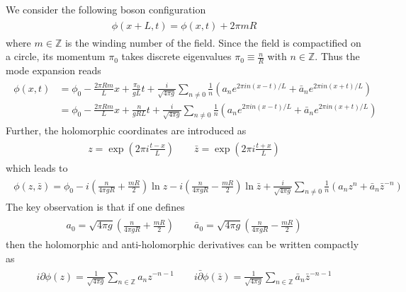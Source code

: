 We consider the following boson configuration
\begin{eqnarray}\begin{aligned}
\phi(x+L,t)=\phi(x,t)+2\pi mR
\end{aligned}\end{eqnarray}
where $m\in\mathbb{Z}$ is the winding number of the field. Since the field is compactified on a circle, its momentum $\pi_0$ takes discrete eigenvalues $\pi_0\equiv\frac{n}{R}$ with $n\in\mathbb{Z}$. Thus the mode expansion reads
\begin{eqnarray}\begin{aligned}
\label{eq:mode_expand_compact}
\phi(x,t)&=\phi_0-\frac{2\pi Rm}{L}x+\frac{\pi_0}{gL}t+\frac{i}{\sqrt{4\pi g}}\sum_{n\neq0}\frac{1}{n}(a_ne^{2\pi i n(x-t)/L}+\bar{a}_{n}e^{2\pi i n(x+t)/L})\\ 
&={\phi}_0-\frac{2\pi Rm}{L}x+\frac{n}{gRL}t+\frac{i}{\sqrt{4\pi g}}\sum_{n\neq0}\frac{1}{n}(a_ne^{2\pi i n(x-t)/L}+\bar{a}_{n}e^{2\pi i n(x+t)/L})
\end{aligned}\end{eqnarray}
Further, the holomorphic coordinates are introduced as
\begin{eqnarray}\begin{aligned}
z=\exp\left(2\pi i\frac{t-x}{L}\right)\qquad\bar{z}=\exp\left(2\pi i\frac{t+x}{L}\right)
\end{aligned}\end{eqnarray}
which leads to 
\begin{eqnarray}\begin{aligned}
\label{eq:phi_in_z}
\phi(z,\bar{z})=\phi_0-i\left(\frac{n}{4\pi gR}+\frac{mR}{2}\right)\ln z-i\left(\frac{n}{4\pi gR}-\frac{mR}{2}\right)\ln \bar{z}+\frac{i}{\sqrt{4\pi g}}\sum_{n\neq0}\frac{1}{n}(a_nz^{n}+\bar{a}_{n}\bar{z}^{-n})
\end{aligned}\end{eqnarray}
The key observation is that if one defines
\begin{eqnarray}\begin{aligned}
a_0=\sqrt{4\pi g}\left(\frac{n}{4\pi gR}+\frac{mR}{2}\right)\qquad\bar{a}_0=\sqrt{4\pi g}\left(\frac{n}{4\pi gR}-\frac{mR}{2}\right)
\end{aligned}\end{eqnarray}
then the holomorphic and anti-holomorphic derivatives can be written compactly as
\begin{eqnarray}\begin{aligned}
i\partial\phi(z)=\frac{1}{\sqrt{4\pi g}}\sum_{n\in\mathbb{Z}}a_{n}z^{-n-1}\qquad i\bar{\partial}\phi(\bar{z})=\frac{1}{\sqrt{4\pi g}}\sum_{n\in\mathbb{Z}}\bar{a}_{n}\bar{z}^{-n-1}
\end{aligned}\end{eqnarray}

